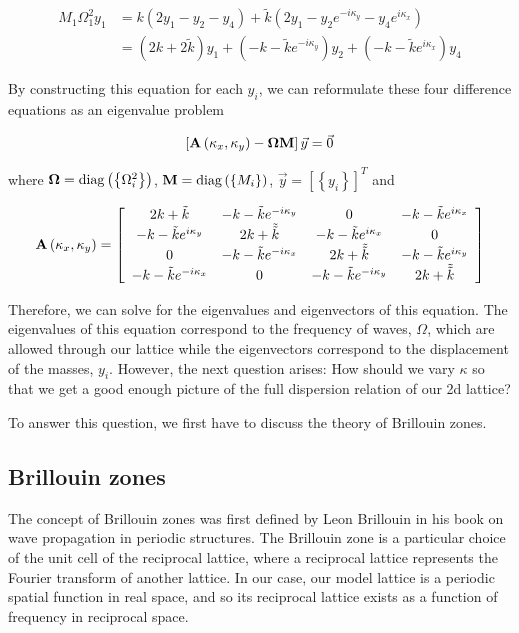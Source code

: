 \begin{align}
  M_1\Omega_1^{2}y_1
      &=k\left(2y_1-y_2-y_4\right)+
       \tilde{k}\left(2y_1-y_{2}e^{-i\kappa_y}-y_{4}e^{i\kappa_x}\right) \\
      &=\left(2k+2\tilde{k}\right)y_1+\left(-k-\tilde{k}e^{-i\kappa_y}\right)y_2+
       \left(-k-\tilde{k}e^{i\kappa_x}\right)y_4
\end{align}

By constructing this equation for each $y_i$, we can reformulate these four
difference equations as an eigenvalue problem

\begin{align}
  \left[\mathbf{A}\left(\kappa_{x},\kappa_{y}\right)-\mathbf{\Omega}\mathbf{M}\right]\vec{y}=\vec{0}
\label{eq:sqeig}
\end{align}

where $\mathbf{\Omega}=\operatorname{diag}\left(\left\{\Omega_i^2\right\}\right)$,
$\mathbf{M}=\operatorname{diag}\left(\left\{M_i\right\}\right)$,
$\vec{y}=\left[\left\{y_i\right\}\right]^T$ and

\begin{align}
  \mathbf{A}\left(\kappa_{x},\kappa_{y}\right)=\left[
\begin{array}{cccc}
2k+\tilde{k} & -k-\tilde{k}e^{-i\kappa_{y}} & 0 & -k-\tilde{k}e^{i\kappa_{x}}\\
-k-\tilde{k}e^{i\kappa_{y}} & 2k+\tilde{\tilde{k}} & -k-\tilde{k}e^{i\kappa_{x}} & 0\\
0 & -k-\tilde{k}e^{-i\kappa_{x}} & 2k+\tilde{\tilde{k}} & -k-\tilde{k}e^{i\kappa_{y}}\\
-k-\tilde{k}e^{-i\kappa_{x}} & 0 & -k-\tilde{k}e^{-i\kappa_{y}} & 2k+\tilde{\tilde{k}}
\end{array}\right]
\end{align}

Therefore, we can solve for the eigenvalues and eigenvectors of this equation.
The eigenvalues of this equation correspond to the frequency of waves,
$\Omega$, which are allowed through our lattice while the eigenvectors
correspond to the displacement of the masses, $y_i$. However, the next question
arises: How should we vary $\kappa$ so that we get a good enough picture of the
full dispersion relation of our 2d lattice?

To answer this question, we first have to discuss the theory of Brillouin zones.

\subsection{Brillouin zones}
\label{brizones}
The concept of Brillouin zones was first defined by Leon Brillouin in his book
on wave propagation in periodic structures.\cite{brillouin} The Brillouin zone
is a particular choice of the unit cell of the reciprocal lattice, where a
reciprocal lattice represents the Fourier transform of another lattice. In our
case, our model lattice is a periodic spatial function in real space, and so
its reciprocal lattice exists as a function of frequency in reciprocal space.


